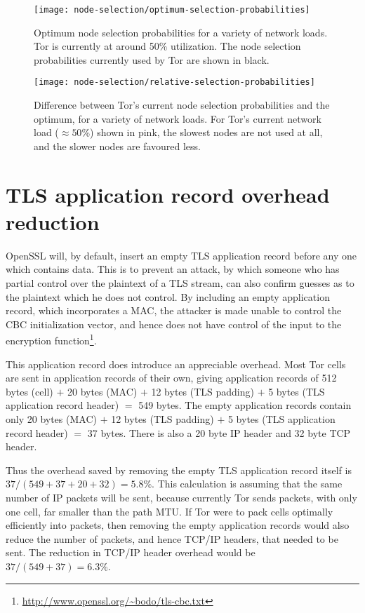 \documentclass{article}
\begin{document}
\begin{figure}
\texttt{[image: node-selection/optimum-selection-probabilities]}
\caption{Optimum node selection probabilities for a variety of network loads. Tor is currently at around 50\% utilization. The node selection probabilities currently used by Tor are shown in black.}
\end{figure}

\begin{figure}
\texttt{[image: node-selection/relative-selection-probabilities]}
\caption{Difference between Tor's current node selection probabilities and the optimum, for a variety of network loads. For Tor's current network load ($\approx 50$\%) shown in pink, the slowest nodes are not used at all, and the slower nodes are favoured less.}
\end{figure}


\section{TLS application record overhead reduction}

OpenSSL will, by default, insert an empty TLS application record before any one which contains data.
This is to prevent an attack, by which someone who has partial control over the plaintext of a TLS stream, can also confirm guesses as to the plaintext which he does not control.
By including an empty application record, which incorporates a MAC, the attacker is made unable to control the CBC initialization vector, and hence does not have control of the input to the encryption function\footnote{\url{http://www.openssl.org/~bodo/tls-cbc.txt}}.

This application record does introduce an appreciable overhead.
Most Tor cells are sent in application records of their own, giving application records of 512 bytes (cell) $+$ 20 bytes (MAC) $+$ 12 bytes (TLS padding) $+$ 5 bytes (TLS application record header) $=$ 549 bytes.
The empty application records contain only 20 bytes (MAC) $+$ 12 bytes (TLS padding) $+$ 5 bytes (TLS application record header) $=$ 37 bytes.
There is also a 20 byte IP header and 32 byte TCP header.

Thus the overhead saved by removing the empty TLS application record itself is $37 / (549 + 37 + 20 + 32) = 5.8\%$.
This calculation is assuming that the same number of IP packets will be sent, because currently Tor sends packets, with only one cell, far smaller than the path MTU.
If Tor were to pack cells optimally efficiently into packets, then removing the empty application records would also reduce the number of packets, and hence TCP/IP headers, that needed to be sent.
The reduction in TCP/IP header overhead would be $37/(549 + 37) = 6.3\%$.
\end{document}
